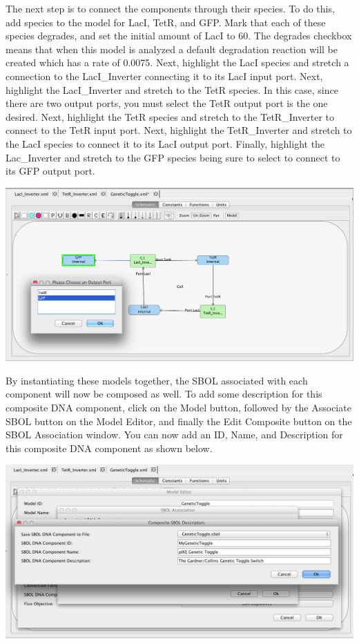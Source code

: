 \documentclass[titlepage,11pt]{article}
\begin{document}
The next step is to connect the components through their species.   To do this, add species to the model for LacI, TetR, and GFP.  Mark that each of these species degrades, and set the initial amount of LacI to 60.  The degrades checkbox means that when this model is analyzed a default degradation reaction will be created which has a rate of 0.0075.  Next, highlight the LacI species and stretch a connection to the LacI\_Inverter connecting it to its LacI input port.  Next, highlight the LacI\_Inverter and stretch to the TetR species.  In this case, since there are two output ports, you must select the TetR output port is the one desired.  Next, highlight the TetR species and stretch to the TetR\_Inverter to connect to the TetR input port.  Next, highlight the TetR\_Inverter and stretch to the LacI species to connect it to its LacI output port.  Finally, highlight the Lac\_Inverter and stretch to the GFP species being sure to select to connect to its GFP output port.  

\begin{center}
\includegraphics[width=160mm]{screenshots/addConnectionGT}
\end{center}

By instantiating these models together, the SBOL associated with each component will now be composed as well.  To add some description for this composite DNA component, click on the Model button, followed by the Associate SBOL button on the Model Editor, and finally the Edit Composite button on the SBOL Association window.  You can now add an ID, Name, and Description for this composite DNA component as shown below.  

\begin{center}
\includegraphics[width=160mm]{screenshots/compSBOLDesc}
\end{center}
\end{document}
